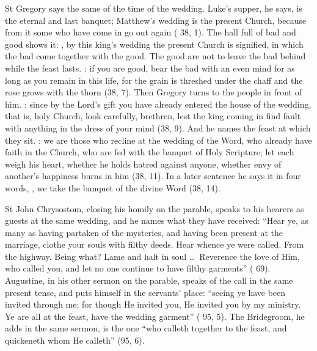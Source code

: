 St Gregory says the same of the time of the wedding. Luke's supper, he says, is
the eternal and last banquet; Matthew's wedding is the present Church, because
from it some who have come in go out again (
38, 1). The hall full of bad and good shows it: , by this
king's wedding the present Church is signified, in which the bad come together
with the good. The good are not to leave the bad behind while the feast lasts.
: if you are good, bear the bad with an even mind for as long
as you remain in this life, for the grain is threshed under the chaff and the
rose grows with the thorn (38, 7). Then Gregory turns to the people in front
of him. : since by the Lord's gift you have already
entered the house of the wedding, that is, holy Church, look carefully,
brethren, lest the king coming in find fault with anything in the dress of
your mind (38, 9). And he names the feast at which they sit. : we are those who
recline at the wedding of the Word, who already have faith in the Church, who
are fed with the banquet of Holy Scripture; let each weigh his heart, whether
he holds hatred against anyone, whether envy of another's happiness burns in
him (38, 11). In a later sentence he says it in four words, , we take the banquet of the divine Word (38, 14).

St John Chrysostom, closing his homily on the parable, speaks to his hearers as
guests at the same wedding, and he names what they have received: ``Hear ye,
as many as having partaken of the mysteries, and having been present at the
marriage, clothe your souls with filthy deeds. Hear whence ye were called. From
the highway. Being what? Lame and halt in soul \dots\ Reverence the love of
Him, who called you, and let no one continue to have filthy garments''
( 69). Augustine, in his other sermon on the parable,
speaks of the call in the same present tense, and puts himself in the
servants' place: ``seeing ye have been invited through me; for though He
invited you, He invited you by my ministry. Ye are all at the feast, have the
wedding garment'' ( 95, 5). The Bridegroom, he adds in the same
sermon, is the one ``who calleth together to the feast, and quickeneth whom He
calleth'' (95, 6).

